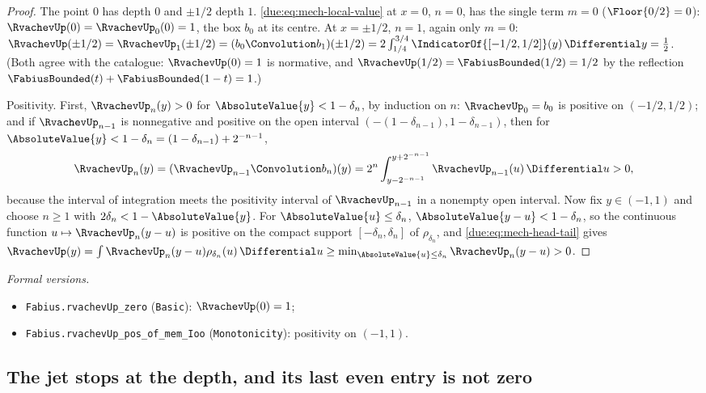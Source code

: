 \documentclass[11pt,oneside]{article}
\theoremstyle{plain}
\theoremstyle{definition}
\theoremstyle{remark}
\newcommand{\upn}[1]{\RvachevUp_{#1}}
\begin{document}
\begin{proof}
The point \(0\) has depth \(0\) and \(\pm1/2\) depth \(1\).
\cref{due:eq:mech-local-value} at \(x=0\), \(n=0\), has the single term
\(m=0\) (\(\Floor{0/2}=0\)): \(\RvachevUp(0)=\upn{0}(0)=1\), the box
\(b_0\) at its centre.  At \(x=\pm1/2\), \(n=1\), again only \(m=0\):
\(\RvachevUp(\pm1/2)=\upn{1}(\pm1/2)=(b_0\Convolution b_1)(\pm1/2)
=2\int_{1/4}^{3/4}\IndicatorOf{[-1/2,1/2]}(y)\,\Differential y=\tfrac12\).
(Both agree with the catalogue: \(\RvachevUp(0)=1\) is normative, and
\(\RvachevUp(1/2)=\FabiusBounded(1/2)=1/2\) by the reflection
\(\FabiusBounded(t)+\FabiusBounded(1-t)=1\).)

Positivity.  First, \(\upn{n}(y)>0\) for \(\AbsoluteValue{y}<1-\delta_n\), by
induction on \(n\): \(\upn{0}=b_0\) is positive on \((-1/2,1/2)\); and if
\(\upn{n-1}\) is nonnegative and positive on the open interval
\((-(1-\delta_{n-1}),1-\delta_{n-1})\), then for
\(\AbsoluteValue{y}<1-\delta_n=(1-\delta_{n-1})+2^{-n-1}\),
\[
 \upn{n}(y)=(\upn{n-1}\Convolution b_n)(y)
 =2^{n}\int_{y-2^{-n-1}}^{y+2^{-n-1}}\upn{n-1}(u)\,\Differential u>0,
\]
because the interval of integration meets the positivity interval of
\(\upn{n-1}\) in a nonempty open interval.  Now fix \(y\in(-1,1)\) and choose
\(n\ge1\) with \(2\delta_n<1-\AbsoluteValue{y}\).  For
\(\AbsoluteValue{u}\le\delta_n\), \(\AbsoluteValue{y-u}<1-\delta_n\), so the
continuous function \(u\mapsto\upn{n}(y-u)\) is positive on the compact
support \([-\delta_n,\delta_n]\) of \(\rho_{\delta_n}\), and
\cref{due:eq:mech-head-tail} gives
\(\RvachevUp(y)=\int\upn{n}(y-u)\rho_{\delta_n}(u)\,\Differential u
\ge\min_{\AbsoluteValue{u}\le\delta_n}\upn{n}(y-u)>0\).
\end{proof}

\emph{Formal versions.}
\begin{sloppypar}
\begin{itemize}
\item \texttt{Fabius.rvachevUp\_zero} (\texttt{Basic}): \(\RvachevUp(0)=1\);
\item \texttt{Fabius.\allowbreak rvachevUp\_\allowbreak pos\_\allowbreak of\_\allowbreak mem\_\allowbreak Ioo} (\texttt{Monotonicity}):
positivity on \((-1,1)\).
\end{itemize}
\end{sloppypar}

\subsection{The jet stops at the depth, and its last even entry is not zero}
\end{document}
